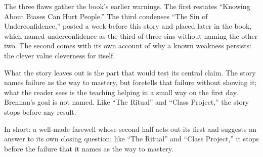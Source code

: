 \begin{afterword}
The three flaws gather the book's earlier warnings. The first restates ``Knowing About Biases Can Hurt People.'' The third condenses ``The Sin of Underconfidence,'' posted a week before this story and placed later in the book, which named underconfidence as the third of three sins without naming the other two. The second comes with its own account of why a known weakness persists: the clever value cleverness for itself.

What the story leaves out is the part that would test its central claim. The story names failure as the way to mastery, but foretells that failure without showing it; what the reader sees is the teaching helping in a small way on the first day. Brennan's goal is not named. Like ``The Ritual'' and ``Class Project,'' the story stops before any result.

In short: a well-made farewell whose second half acts out its first and suggests an answer to its own closing question; like ``The Ritual'' and ``Class Project,'' it stops before the failure that it names as the way to mastery.
\end{afterword}

